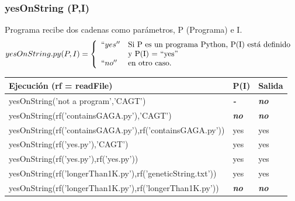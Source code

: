\documentclass[xcolor=table]{beamer}
\begin{document}
\begin{frame}  \frametitle{yesOnString (P,I)}  \footnotesize  

Programa recibe dos cadenas como parámetros,  P (Programa) e I. 
    \begin{equation}
      yesOnString.py (P,I) =  \left\{
	        \begin{array}{ll}
		  ``yes''      & \text{Si P es un programa Python, P(I) está definido } \\
                        &   \text{y P(I) = ``yes''} \\
		``no''     & \text{en otro caso.} \\
	       \end{array}
	    \right.
    \end{equation}


     \begin{table}[]
     \begin{tabular}{|l|l|l|}
          \hline
    \rowcolor[HTML]{EFEFEF} 
     {\color[HTML]{000000} \textbf{Ejecución (rf = readFile)}} & {\color[HTML]{000000} \textbf{P(I)}}   & {\color[HTML]{000000} \textbf{Salida}}             \\ \hline\hline
     yesOnString('not a program','CAGT')           & \color[HTML]{FE0000} \textit{\textbf{-}}             & \color[HTML]{FE0000} \textit{\textbf{no}}  \\ \hline\hline
     yesOnString(rf('containsGAGA.py'),'CAGT')     & \color[HTML]{FE0000} \textit{\textbf{no}}            & \color[HTML]{FE0000} \textit{\textbf{no}}  \\ \hline
     yesOnString(rf('containsGAGA.py'),rf('containsGAGA.py')) & yes  & yes \\ \hline\hline
     yesOnString(rf('yes.py'),'CAGT')                & yes           & yes \\ \hline
     yesOnString(rf('yes.py'),rf('yes.py'))         & yes            & yes \\ \hline\hline
     yesOnString(rf('longerThan1K.py'),rf('geneticString.txt')) & yes & yes \\ \hline
  yesOnString(rf('longerThan1K.py'),rf('longerThan1K.py'))  & \color[HTML]{FE0000} \textit{\textbf{no}}  & \color[HTML]{FE0000} \textit{\textbf{no}}  \\ \hline
     \end{tabular}
\end{table}

\end{frame} 
\end{document}
